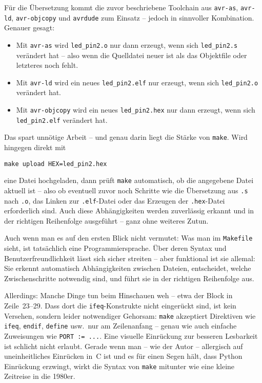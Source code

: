 \documentclass[a4paper,12pt]{article}
\begin{document}
\medskip
Für die Übersetzung kommt die zuvor beschriebene Toolchain aus \texttt{avr-as},
\texttt{avr-ld}, \texttt{avr-objcopy} und \texttt{avrdude} zum Einsatz – jedoch
in sinnvoller Kombination. Genauer gesagt:

\begin{itemize}
\item
    Mit \texttt{avr-as} wird \texttt{led\_pin2.o} nur dann erzeugt, wenn sich
    \texttt{led\_pin2.s} verändert hat – also wenn die Quelldatei neuer ist
    als das Objektfile oder letzteres noch fehlt.
\item
    Mit \texttt{avr-ld} wird ein neues \texttt{led\_pin2.elf} nur erzeugt, wenn
    sich \texttt{led\_pin2.o} verändert hat.
\item
    Mit \texttt{avr-objcopy} wird ein neues \texttt{led\_pin2.hex} nur dann
    erzeugt, wenn sich \texttt{led\_pin2.elf} verändert hat.
\end{itemize}

\noindent
Das spart unnötige Arbeit – und genau darin liegt die Stärke von \texttt{make}.
\medskip  
Wird hingegen direkt mit  
\begin{lstlisting}
make upload HEX=led_pin2.hex
\end{lstlisting}  
eine Datei hochgeladen, dann prüft \texttt{make} automatisch, ob die angegebene
Datei aktuell ist – also ob eventuell zuvor noch
Schritte wie die Übersetzung aus \texttt{.s} nach \texttt{.o}, das Linken zur
\texttt{.elf}-Datei oder das Erzeugen der \texttt{.hex}-Datei erforderlich
sind. Auch diese Abhängigkeiten werden zuverlässig erkannt und in der richtigen
Reihenfolge ausgeführt – ganz ohne weiteres Zutun.

Auch wenn man es auf den ersten Blick nicht vermutet:  Was man im
\texttt{Makefile} sieht, ist tatsächlich eine Programmiersprache.  Über deren
Syntax und Benutzerfreundlichkeit lässt sich sicher streiten – aber funktional
ist sie allemal:  Sie erkennt automatisch Abhängigkeiten zwischen Dateien,
entscheidet, welche Zwischenschritte notwendig sind,  und führt sie in der
richtigen Reihenfolge aus.

Allerdings: Manche Dinge tun beim Hinschauen weh – etwa der Block in
Zeile~23--29.  Dass dort die \texttt{ifeq}-Konstrukte nicht eingerückt sind,
ist kein Versehen, sondern leider notwendiger Gehorsam:  \texttt{make}
akzeptiert Direktiven wie \texttt{ifeq}, \texttt{endif}, \texttt{define} usw.\
nur am Zeilenanfang –  genau wie auch einfache Zuweisungen wie
\texttt{PORT~:=~...}.  Eine visuelle Einrückung zur besseren Lesbarkeit ist
schlicht nicht erlaubt.  Gerade wenn man – wie der Autor – allergisch auf
uneinheitliches Einrücken in~C ist  und es für einen Segen hält, dass Python
Einrückung erzwingt,  wirkt die Syntax von \texttt{make} mitunter wie eine
kleine Zeitreise in die 1980er.
\end{document}
